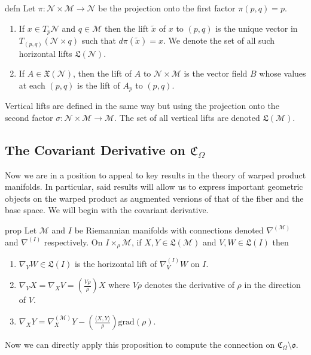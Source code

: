 \documentclass{article}
\newcommand{\man}{\mathcal{M}}
\begin{document}
\begin{restatable}{defn}{}
    Let $\pi: \mathcal{N} \times \man\rightarrow \mathcal{N}$ be the projection onto the first factor $\pi(p, q) = p$. 
    \begin{enumerate}
        \item If $x \in T_p\mathcal{N}$ and $q \in \mathcal{M}$ then the lift $\tilde{x}$ of $x$ to $(p,q)$ is the unique vector in $T_{(p,q)}(\mathcal{N} \times q)$ such that $d\pi(\tilde{x}) = x$. We denote the set of all such horizontal lifts $\mathfrak{L}(\mathcal{N}).$
        \item If $A \in \mathfrak{X}(\mathcal{N})$, then the lift of $A$ to $\mathcal{N} \times \man$ is the vector field $B$ whose values at each $(p,q)$ is the lift of $A_p$ to $(p,q).$
    \end{enumerate}
    Vertical lifts are defined in the same way but using the projection onto the second factor $\sigma: \mathcal{N} \times \man \rightarrow \man$. The set of all vertical lifts are denoted $\mathfrak{L}(\man).$ 
\end{restatable}

\subsection{The Covariant Derivative on $\mathfrak{C}_\Omega$}

Now we are in a position to appeal to key results in the theory of warped product manifolds. In particular, said results will allow us to express important geometric objects on the warped product as augmented versions of that of the fiber and the base space. We will begin with the covariant derivative.

\begin{restatable}{prop}{}
    Let $\man$ and $I$ be Riemannian manifolds with connections denoted $\nabla^{(\man)}$ and $\nabla^{(I)}$ respectively. On $I \times_\rho \man$, if $X, Y \in \mathfrak{L}(\man)$ and $V, W \in \mathfrak{L}(I)$ then
    \begin{enumerate}
        \item $\nabla_VW \in \mathfrak{L}(I)$ is the horizontal lift of $\nabla^{(I)}_VW$ on $I$.
        \item $\nabla_VX = \nabla_XV = \left(\frac{V\rho}{\rho}\right)X$ where $V\rho$ denotes the derivative of $\rho$ in the direction of $V$.
        \item $\nabla_XY = \nabla_X^{(\man)}Y - \left(\frac{\langle X, Y\rangle}{\rho}\right)\text{grad}(\rho)$.
    \end{enumerate}
\end{restatable}
\noindent Now we can directly apply this proposition to compute the connection on $\mathfrak{C}_\Omega \setminus \mathfrak{o}.$ 
\end{document}
